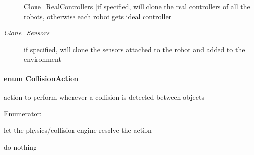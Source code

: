 \begin{Desc}
\begin{description}
{{Clone\_\-RealControllers}
\label{namespaceOpenRAVE_a16bea31a72c441a002538eac01a118f2a0f3adf019cab24fd7564e167aac6308b}
}]if specified, will clone the real controllers of all the robots, otherwise each robot gets ideal controller \item[{\em 
\hypertarget{namespaceOpenRAVE_a16bea31a72c441a002538eac01a118f2add1ddf3837f8e9fe41aa04fbdf1f10b1}{
Clone\_\-Sensors}
\label{namespaceOpenRAVE_a16bea31a72c441a002538eac01a118f2add1ddf3837f8e9fe41aa04fbdf1f10b1}
}]if specified, will clone the sensors attached to the robot and added to the environment \end{description}
\end{Desc}

\hypertarget{namespaceOpenRAVE_aec38ff628d76ac03cb4ac5d8f5cf3664}{
\paragraph[{CollisionAction}]{\setlength{\rightskip}{0pt plus 5cm}enum {\bf CollisionAction}}\hfill}
\label{namespaceOpenRAVE_aec38ff628d76ac03cb4ac5d8f5cf3664}


action to perform whenever a collision is detected between objects 

\begin{Desc}
\item[Enumerator: ]\par
\begin{description}
\item[{\em 
\hypertarget{namespaceOpenRAVE_aec38ff628d76ac03cb4ac5d8f5cf3664a513d78b13cab5e6407e97b8210ae20ca}{
CA\_\-DefaultAction}
\label{namespaceOpenRAVE_aec38ff628d76ac03cb4ac5d8f5cf3664a513d78b13cab5e6407e97b8210ae20ca}
}]let the physics/collision engine resolve the action \item[{\em 
\hypertarget{namespaceOpenRAVE_aec38ff628d76ac03cb4ac5d8f5cf3664a0ff1e9bcfdd50e768f778a18183da252}{
CA\_\-Ignore}
\label{namespaceOpenRAVE_aec38ff628d76ac03cb4ac5d8f5cf3664a0ff1e9bcfdd50e768f778a18183da252}
}]do nothing \end{description}
\end{Desc}

